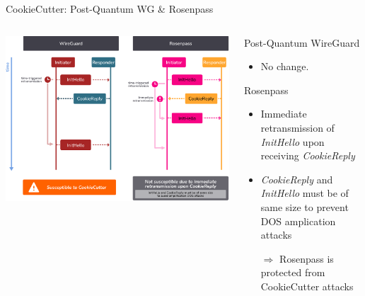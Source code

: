 \begin{frame}{CookieCutter: Post-Quantum WG \& Rosenpass}
  \begin{columns}[fullwidth,T]
    \begin{column}{.6\linewidth}
      \includegraphics[keepaspectratio,height=.85\textheight]{graphics/cookiecutter-compare.pdf}
    \end{column}

    \begin{column}{.4\linewidth}
      \begin{block}{Post-Quantum WireGuard}
      \begin{itemize}
        \item No change.
      \end{itemize}
      \end{block}

      \begin{block}{Rosenpass}
      \begin{itemize}
        \item Immediate retransmission of \emph{InitHello} upon receiving \emph{CookieReply}
        \item \emph{CookieReply} and \emph{InitHello} must be of same size to prevent DOS amplication attacks
        \item[$\Rightarrow$] Rosenpass is protected from CookieCutter attacks
      \end{itemize}
      \end{block}
    \end{column}
  \end{columns}
\end{frame}

